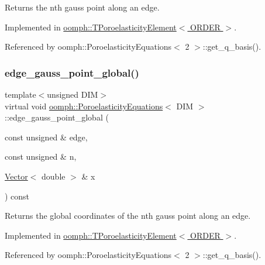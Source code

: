 Returns the nth gauss point along an edge. 



Implemented in \hyperlink{classoomph_1_1TPoroelasticityElement_a1c6d52613fdb0e2d56c49ef17f4774bc}{oomph\+::\+T\+Poroelasticity\+Element$<$ O\+R\+D\+E\+R $>$}.



Referenced by oomph\+::\+Poroelasticity\+Equations$<$ 2 $>$\+::get\+\_\+q\+\_\+basis().

\mbox{\label{classoomph_1_1PoroelasticityEquations_a9809ca678dced8e69cb74dd7a75dffda}} 
\subsubsection{\texorpdfstring{edge\+\_\+gauss\+\_\+point\+\_\+global()}{edge\_gauss\_point\_global()}}
{\footnotesize\ttfamily template$<$unsigned D\+IM$>$ \\
virtual void \hyperlink{classoomph_1_1PoroelasticityEquations}{oomph\+::\+Poroelasticity\+Equations}$<$ D\+IM $>$\+::edge\+\_\+gauss\+\_\+point\+\_\+global (\begin{DoxyParamCaption}\item[{const unsigned \&}]{edge,  }\item[{const unsigned \&}]{n,  }\item[{\hyperlink{classoomph_1_1Vector}{Vector}$<$ double $>$ \&}]{x }\end{DoxyParamCaption}) const\hspace{0.3cm}{\ttfamily [pure virtual]}}



Returns the global coordinates of the nth gauss point along an edge. 



Implemented in \hyperlink{classoomph_1_1TPoroelasticityElement_ae16942ca84bf7bc23eed93cdeb08efce}{oomph\+::\+T\+Poroelasticity\+Element$<$ O\+R\+D\+E\+R $>$}.



Referenced by oomph\+::\+Poroelasticity\+Equations$<$ 2 $>$\+::get\+\_\+q\+\_\+basis().

\mbox{\label{classoomph_1_1PoroelasticityEquations_a88a5a2beb7f2c3c8909fb09020199af9}} 
